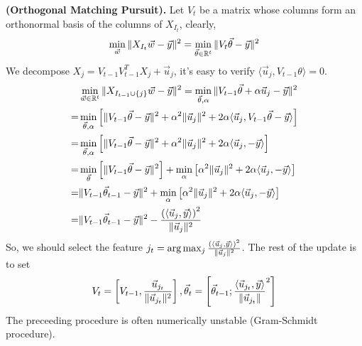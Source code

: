 \begin{example}
\textbf{(Orthogonal Matching Pursuit).}
Let $ V_t $ be a matrix whose columns form an orthonormal basis of the columns of $ X_{I_t} $, clearly,
\[
    \min_{\vec{w}} \Arrowvert X_{I_t} \vec{w} - \vec{y} \Arrowvert^2 = \min_{\vec{\theta} \in \mathbb{R}^t} \Arrowvert V_t \vec{\theta} - \vec{y} \Arrowvert^2
\]
We decompose $ X_j = V_{t-1}V_{t-1}^T X_j + \vec{u}_j $, it's easy to verify $ \langle \vec{u}_j, V_{t-1}\theta \rangle = 0 $.
\begin{align*}
    &\min_{\vec{w} \in \mathbb{R}^t} \Arrowvert X_{I_{t-1} \cup \left\{ j \right\}} \vec{w} - \vec{y} \Arrowvert^2
    = \min_{\vec{\theta}, \alpha} \Arrowvert V_{t-1}\vec{\theta} + \alpha \vec{u}_j - \vec{y} \Arrowvert^2\\
    =& \min_{\vec{\theta}, \alpha} \left[ \Arrowvert V_{t-1} \vec{\theta} - \vec{y} \Arrowvert^2 + \alpha^2 \Arrowvert \vec{u}_j \Arrowvert^2 + 2\alpha \langle \vec{u}_j, V_{t-1}\vec{\theta} - \vec{y} \rangle \right]\\
    =& \min_{\vec{\theta}, \alpha} \left[ \Arrowvert V_{t-1} \vec{\theta} - \vec{y} \Arrowvert^2 + \alpha^2 \Arrowvert \vec{u}_j \Arrowvert^2 + 2\alpha \langle \vec{u}_j, - \vec{y} \rangle \right]\\
    =& \min_{\vec{\theta}} \left[ \Arrowvert V_{t-1} \vec{\theta} - \vec{y} \Arrowvert^2 \right]+ \min_{\alpha}\left[ \alpha^2 \Arrowvert \vec{u}_j \Arrowvert^2 + 2\alpha \langle \vec{u}_j, - \vec{y} \rangle \right]\\
    =& \Arrowvert V_{t-1}\vec{\theta}_{t-1} - \vec{y} \Arrowvert^2 + \min_{\alpha}\left[ \alpha^2 \Arrowvert \vec{u}_j \Arrowvert^2 + 2\alpha \langle \vec{u}_j, - \vec{y} \rangle \right]\\
    =& \Arrowvert V_{t-1}\vec{\theta}_{t-1} - \vec{y} \Arrowvert^2 - \frac{{(\langle \vec{u}_j, \vec{y} \rangle)}^2}{\Arrowvert \vec{u}_j \Arrowvert^2} 
\end{align*}
So, we should select the feature $ j_t = \arg\max_{j} \frac{{(\langle \vec{u}_j, \vec{y} \rangle)}^2}{\Arrowvert \vec{u}_j \Arrowvert^2} $. The rest of the update is to set
\[
    V_t = \left[ V_{t-1}, \frac{\vec{u}_{j_t}}{ \Arrowvert \vec{u}_{j_t} \Arrowvert^2}  \right],
    \vec{\theta}_t = \left[ \vec{\theta}_{t-1}; \frac{\langle \vec{u}_{j_t}, \vec{y} \rangle}{ \Arrowvert \vec{u}_{j_t} \Arrowvert}^2  \right]
\]
The preceeding procedure is often numerically unstable (Gram-Schmidt procedure).


\end{example}
